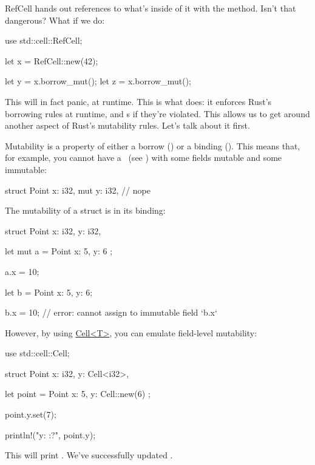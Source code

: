 RefCell hands out  references to what's inside of it with the  method. Isn't that dangerous? What if 
we do:

\begin{rustc}
use std::cell::RefCell;

let x = RefCell::new(42);

let y = x.borrow_mut();
let z = x.borrow_mut();
\end{rustc}

This will in fact panic, at runtime. This is what  does: it enforces Rust's borrowing rules at runtime, and 
\panic s if they're violated. This allows us to get around another aspect of Rust's mutability rules. Let's talk about it 
first.


Mutability is a property of either a borrow () or a binding (). This means that, for example, you cannot 
have a \struct\ (see ) with some fields mutable and some immutable:

\begin{rustc}
struct Point {
    x: i32,
    mut y: i32, // nope
}
\end{rustc}

The mutability of a struct is in its binding:

\begin{rustc}
struct Point {
    x: i32,
    y: i32,
}

let mut a = Point { x: 5, y: 6 };

a.x = 10;

let b = Point { x: 5, y: 6};

b.x = 10; // error: cannot assign to immutable field `b.x`
\end{rustc}

However, by using \href{https://doc.rust-lang.org/std/cell/struct.Cell.html}{Cell<T>}, you can emulate field-level mutability:

\begin{rustc}
use std::cell::Cell;

struct Point {
    x: i32,
    y: Cell<i32>,
}

let point = Point { x: 5, y: Cell::new(6) };

point.y.set(7);

println!("y: {:?}", point.y);
\end{rustc}

This will print . We've successfully updated \y.

